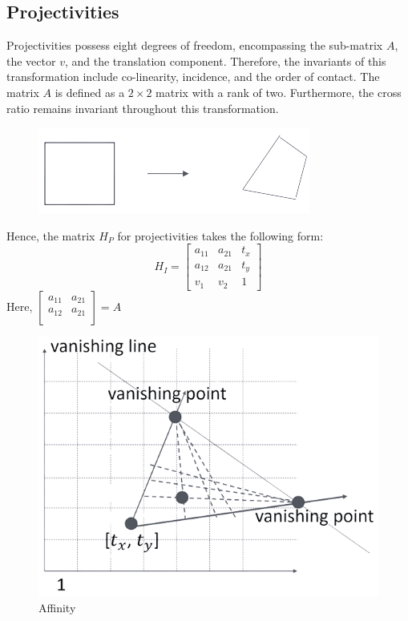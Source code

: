 \subsection*{Projectivities}
Projectivities possess eight degrees of freedom, encompassing the sub-matrix $A$, the vector $v$, and the translation component. 
Therefore, the invariants of this transformation include co-linearity, incidence, and the order of contact.
The matrix $A$ is defined as a $2 \times 2$ matrix with a rank of two. 
Furthermore, the cross ratio remains invariant throughout this transformation.
\begin{figure}[H]
    \centering
    \includegraphics[width=0.25\linewidth]{images/projectivities.png}
\end{figure}
Hence, the matrix $H_P$ for projectivities takes the following form:
\[H_I=
\begin{bmatrix}
    a_{11} & a_{21} & t_x \\
    a_{12} & a_{21} & t_y \\
    v_1 & v_2 & 1
\end{bmatrix}\]
Here, $
\begin{bmatrix}
    a_{11} & a_{21} \\
    a_{12} & a_{21} \\
\end{bmatrix}
=A$
\begin{figure}[H]
    \centering
    \includegraphics[width=0.25\linewidth]{images/projectivities1.png}
    \caption{Affinity}
\end{figure}
